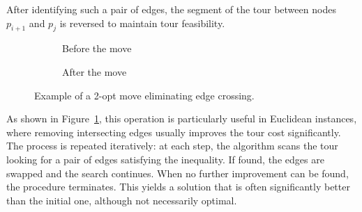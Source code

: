 After identifying such a pair of edges, the segment of the tour between nodes $p_{i+1}$ and $p_j$ is reversed to maintain tour feasibility.

\begin{figure}[H]
    \centering
    \begin{subfigure}[c]{.4\textwidth}
        \centering
        \caption{Before the move}
    \end{subfigure}
    \hfill
    \begin{subfigure}[c]{.4\textwidth}
        \centering
        \caption{After the move}
    \end{subfigure}
    \caption{Example of a 2-opt move eliminating edge crossing.}
    \label{fig:2optmove}
\end{figure}


As shown in Figure~\ref{fig:2optmove}, this operation is particularly useful in Euclidean instances, where removing intersecting edges 
usually improves the tour cost significantly. The process is repeated iteratively: at each step, the algorithm scans the tour looking 
for a pair of edges satisfying the inequality. If found, the edges are swapped and the search continues. 
When no further improvement can be found, the procedure terminates. This yields a solution that is often significantly better than the initial one, 
although not necessarily optimal.

